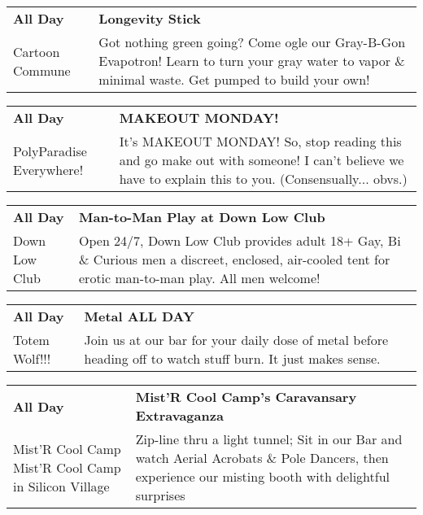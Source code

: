 \begin{tabular}{ p{1in} p{2.2in} }
    \textbf{All Day} & \textbf{Longevity Stick} \\
    Cartoon Commune \newline  & Got nothing green going? Come ogle our Gray-B-Gon Evapotron! Learn to turn your gray water to vapor \& minimal waste. Get pumped to build your own! \\
    \hline 
\end{tabular}
    
\begin{tabular}{ p{1in} p{2.2in} }
    \textbf{All Day} & \textbf{MAKEOUT MONDAY!} \\
    PolyParadise \newline Everywhere! & It's MAKEOUT MONDAY! So, stop reading this and go make out with someone! I can't believe we have to explain this to you. (Consensually... obvs.) \\
    \hline 
\end{tabular}
    
\begin{tabular}{ p{1in} p{2.2in} }
    \textbf{All Day} & \textbf{Man-to-Man Play at Down Low Club} \\
    Down Low Club \newline  & Open 24/7, Down Low Club provides adult 18+ Gay, Bi \& Curious men a discreet, enclosed, air-cooled tent for erotic man-to-man play. All men welcome! \\
    \hline 
\end{tabular}
    
\begin{tabular}{ p{1in} p{2.2in} }
    \textbf{All Day} & \textbf{Metal ALL DAY } \\
    Totem Wolf!!! \newline  & Join us at our bar for your daily dose of metal before heading off to watch stuff burn. It just makes sense. \\
    \hline 
\end{tabular}
    
\begin{tabular}{ p{1in} p{2.2in} }
    \textbf{All Day} & \textbf{Mist'R Cool Camp's Caravansary Extravaganza} \\
    Mist'R Cool Camp \newline Mist'R Cool Camp in Silicon Village & Zip-line thru a light tunnel; Sit in our Bar and watch Aerial Acrobats \& Pole Dancers, then experience our misting booth with delightful surprises \\
    \hline 
\end{tabular}
    
